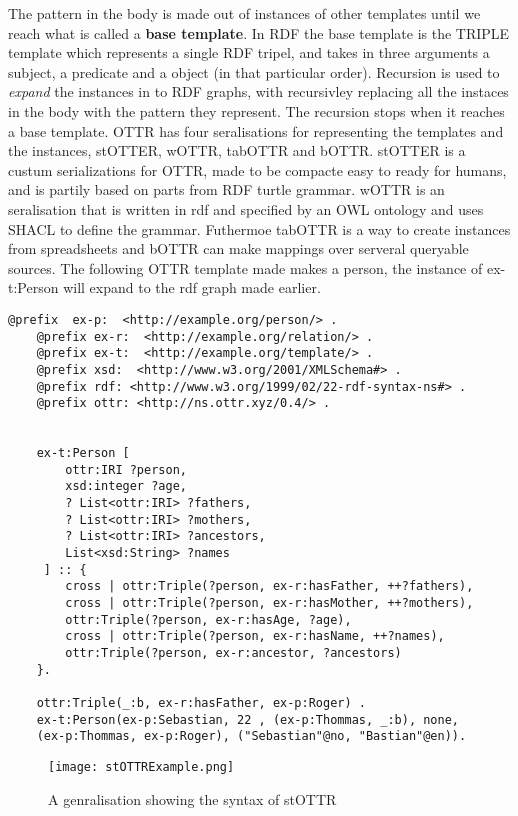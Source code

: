 The pattern in the body is made out of instances of other templates until we reach what is called a \textbf{base template}. 
In RDF the base template is the TRIPLE template which represents a single RDF tripel, and takes in three arguments a subject,
a predicate and a object (in that particular order). Recursion is used to \textit{expand} the instances in to RDF graphs, with recursivley
replacing all the instaces in the body with the pattern they represent. The recursion stops when it reaches a base template.
OTTR has four seralisations for representing the templates and the instances, stOTTER, wOTTR, tabOTTR and bOTTR. stOTTER is a custum serializations
for OTTR, made to be compacte easy to ready for humans, and is partily based on parts from RDF turtle grammar.
wOTTR is an seralisation that is written in rdf and specified by an OWL ontology and uses SHACL to define the grammar. Futhermoe tabOTTR is
a way to create instances from spreadsheets and bOTTR can make mappings over serveral queryable sources. The following OTTR template 
made makes a person, the instance of ex-t:Person will expand to the rdf graph made earlier.

\begin{lstlisting}[frame=single]
    @prefix  ex-p:  <http://example.org/person/> . 
    @prefix ex-r:  <http://example.org/relation/> .
    @prefix ex-t:  <http://example.org/template/> . 
    @prefix xsd:  <http://www.w3.org/2001/XMLSchema#> . 
    @prefix rdf: <http://www.w3.org/1999/02/22-rdf-syntax-ns#> .
    @prefix ottr: <http://ns.ottr.xyz/0.4/> .
    
    
    ex-t:Person [
        ottr:IRI ?person,
        xsd:integer ?age,
        ? List<ottr:IRI> ?fathers,
        ? List<ottr:IRI> ?mothers,
        ? List<ottr:IRI> ?ancestors,
        List<xsd:String> ?names
     ] :: {
        cross | ottr:Triple(?person, ex-r:hasFather, ++?fathers),
        cross | ottr:Triple(?person, ex-r:hasMother, ++?mothers),
        ottr:Triple(?person, ex-r:hasAge, ?age),
        cross | ottr:Triple(?person, ex-r:hasName, ++?names),
        ottr:Triple(?person, ex-r:ancestor, ?ancestors)
    }.
    
    ottr:Triple(_:b, ex-r:hasFather, ex-p:Roger) .
    ex-t:Person(ex-p:Sebastian, 22 , (ex-p:Thommas, _:b), none, 
    (ex-p:Thommas, ex-p:Roger), ("Sebastian"@no, "Bastian"@en)).
\end{lstlisting}

\begin{figure}
    \centering
    \texttt{[image: stOTTRExample.png]}
    \caption{A genralisation showing the syntax of stOTTR}
    \label{fig:stOTTERGenralisation}
\end{figure}

